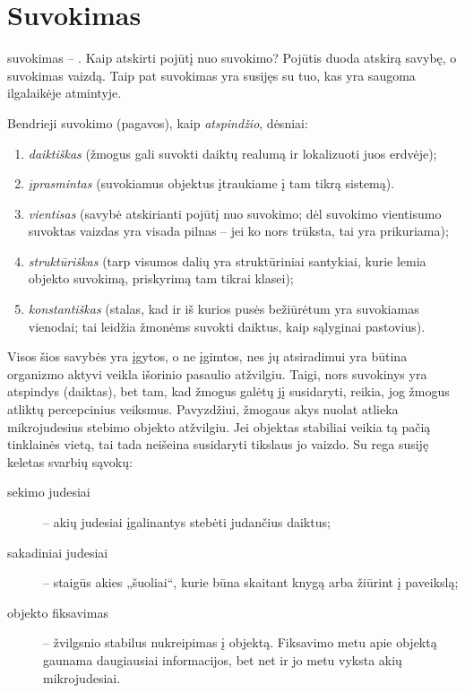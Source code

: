 \section{Suvokimas}

\label{tema:suvokimas}

\Gls{suvokimas} – . Kaip atskirti pojūtį nuo 
suvokimo? Pojūtis duoda atskirą savybę, o suvokimas vaizdą. Taip pat 
suvokimas yra susijęs su tuo, kas yra saugoma ilgalaikėje atmintyje.

Bendrieji suvokimo (pagavos), kaip \emph{atspindžio}, dėsniai:
\begin{enumerate}
  \item \emph{daiktiškas} (žmogus gali suvokti daiktų realumą ir 
    lokalizuoti juos erdvėje);
  \item \emph{įprasmintas} (suvokiamus objektus įtraukiame į tam tikrą 
    sistemą).
  \item \emph{vientisas} (savybė atskirianti pojūtį nuo suvokimo; dėl
    suvokimo vientisumo suvoktas vaizdas yra visada pilnas – jei ko nors
    trūksta, tai yra prikuriama);
  \item \emph{struktūriškas} (tarp visumos dalių yra struktūriniai 
    santykiai, kurie lemia objekto suvokimą, priskyrimą tam tikrai klasei);
  \item \emph{konstantiškas} (stalas, kad ir iš kurios pusės bežiūrėtum
    yra suvokiamas vienodai; tai leidžia žmonėms suvokti daiktus, kaip 
    sąlyginai pastovius).
\end{enumerate}
Visos šios savybės yra įgytos, o ne įgimtos, nes jų atsiradimui yra
būtina organizmo aktyvi veikla išorinio pasaulio atžvilgiu. Taigi, nors
suvokinys yra atspindys (daiktas), bet tam, kad žmogus galėtų jį
susidaryti, reikia, jog žmogus atliktų percepcinius veiksmus. Pavyzdžiui,
žmogaus akys nuolat atlieka mikrojudesius stebimo objekto atžvilgiu.
Jei objektas stabiliai veikia tą pačią tinklainės vietą, tai tada 
neišeina susidaryti tikslaus jo vaizdo. Su rega susiję keletas svarbių 
sąvokų:
\begin{description}
  \item[sekimo judesiai] – akių judesiai įgalinantys stebėti judančius
    daiktus;
  \item[sakadiniai judesiai] – staigūs akies „šuoliai“, kurie būna skaitant
    knygą arba žiūrint į paveikslą;
  \item[objekto fiksavimas] – žvilgsnio stabilus nukreipimas į objektą.
    Fiksavimo metu apie objektą gaunama daugiausiai informacijos, bet
    net ir jo metu vyksta akių mikrojudesiai.
\end{description}

